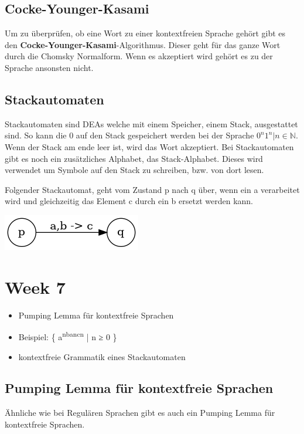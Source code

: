 \documentclass[11pt,twoside,landscape]{article}
\begin{document}
\begin{multicols}{3}
\subsection*{Cocke-Younger-Kasami}
\label{sec:orgd62f3d8}
Um zu überprüfen, ob eine Wort zu einer kontextfreien Sprache gehört gibt es den \textbf{Cocke-Younger-Kasami}-Algorithmus. Dieser geht für das ganze Wort durch die Chomsky Normalform. Wenn es akzeptiert wird gehört es zu der Sprache ansonsten nicht.

\subsection*{Stackautomaten}
\label{sec:orgca1d161}
Stackautomaten sind DEAs welche mit einem Speicher, einem Stack, ausgestattet sind. So kann die 0 auf den Stack gespeichert werden bei der Sprache \({0^n1^n | n \in \mathbb{N}}\). Wenn der Stack am ende leer ist, wird das Wort akzeptiert. Bei Stackautomaten gibt es noch ein zusätzliches Alphabet, das Stack-Alphabet. Dieses wird verwendet um Symbole auf den Stack zu schreiben, bzw. von dort lesen.

Folgender Stackautomat, geht vom Zustand p nach q über, wenn ein a verarbeitet wird und gleichzeitig das Element c durch ein b ersetzt werden kann.
\begin{center}
\includegraphics[width=.9\linewidth]{static/img/autospr/even_zero_dea.png}
\end{center}

\section*{Week 7}
\label{sec:orgd0c27cf}
\begin{itemize}
\item Pumping Lemma für kontextfreie Sprachen
\item Beispiel: \{ a\textsuperscript{nba}\textsuperscript{nc}\textsuperscript{n} | n ≥ 0 \}
\item kontextfreie Grammatik eines Stackautomaten
\end{itemize}

\subsection*{Pumping Lemma für kontextfreie Sprachen}
\label{sec:orgd35f554}
Ähnliche wie bei Regulären Sprachen gibt es auch ein Pumping Lemma für kontextfreie Sprachen.


\end{multicols}
\end{document}
